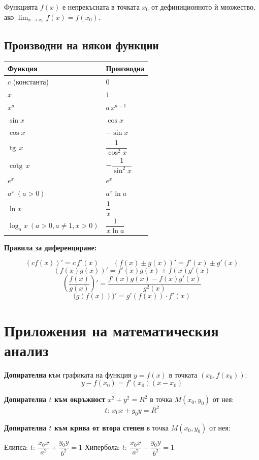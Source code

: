 \documentclass[12pt,a4paper]{article}
\renewcommand{\tg}{\operatorname{tg}}
\newcommand{\cotg}{\operatorname{cotg}}
\begin{document}
Функцията $f(x)$ е непрекъсната в точката $x_0$ от дефиниционното ѝ множество, ако
$\displaystyle\lim_{x\to x_0}f(x)=f(x_0)$.

\subsection{Производни на някои функции}

\begin{center}
\renewcommand{\arraystretch}{1.7}
\begin{tabular}{ll}
\toprule
\textbf{Функция} & \textbf{Производна} \\
\midrule
$c$ (константа) & $0$ \\
$x$ & $1$ \\
$x^a$ & $a\,x^{a-1}$ \\
$\sin x$ & $\cos x$ \\
$\cos x$ & $-\sin x$ \\
$\tg\,x$ & $\dfrac{1}{\cos^2 x}$ \\
$\cotg\,x$ & $-\dfrac{1}{\sin^2 x}$ \\
$e^x$ & $e^x$ \\
$a^x\ (a>0)$ & $a^x\ln a$ \\
$\ln x$ & $\dfrac1x$ \\
$\log_a x\ (a{>}0,a{\neq}1,x{>}0)$ & $\dfrac{1}{x\ln a}$ \\
\bottomrule
\end{tabular}
\end{center}

\textbf{Правила за диференциране:}

$$(cf(x))'=c\,f'(x) \qquad (f(x)\pm g(x))'=f'(x)\pm g'(x)$$
$$(f(x)g(x))'=f'(x)g(x)+f(x)g'(x)$$
$$\left(\frac{f(x)}{g(x)}\right)'=\frac{f'(x)g(x)-f(x)g'(x)}{g^2(x)}$$
$$\big(g(f(x))\big)'=g'(f(x))\cdot f'(x)$$

\section{Приложения на математическия анализ}

\textbf{Допирателна} към графиката на функция $y=f(x)$ в точката $(x_0,f(x_0))$:
$$y-f(x_0)=f'(x_0)(x-x_0)$$

\textbf{Допирателна $t$ към окръжност} $x^2+y^2=R^2$ в точка $M(x_0,y_0)$ от нея:
$$t:\ x_0x+y_0y=R^2$$

\textbf{Допирателна $t$ към крива от втора степен} в точка $M(x_0,y_0)$ от нея:

Елипса: \quad $t:\ \dfrac{x_0x}{a^2}+\dfrac{y_0y}{b^2}=1$ \qquad\qquad Хипербола: \quad $t:\ \dfrac{x_0x}{a^2}-\dfrac{y_0y}{b^2}=1$
\end{document}

